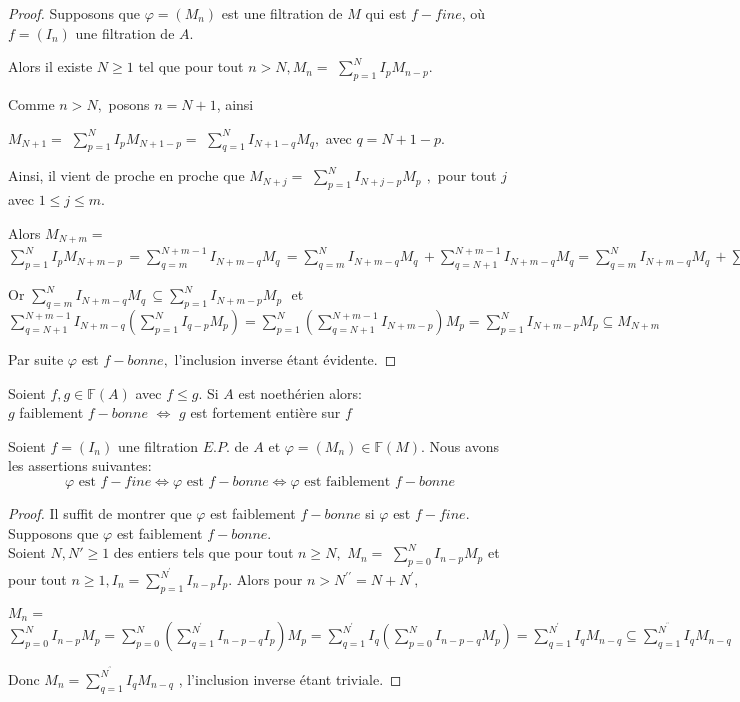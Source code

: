 \begin{proof}
	Supposons que $\varphi =(M_{n})$ est une filtration de $M$ qui est $f-fine$,
	où $f=(I_{n})$ une filtration de $A.$
	
	Alors il existe $N\geq 1$ tel que pour tout $n>N,M_{n}=$ $%
	\sum\limits_{p=1}^{N}I_{p}M_{n-p}.$
	
	Comme $n>N,$ posons $n=N+1$, ainsi
	
	$M_{N+1}=$ $\sum\limits_{p=1}^{N}I_{p}M_{N+1-p}=$ $\sum\limits_{q=1}^{N}I_{N+1-q}M_{q},$ avec $q=N+1-p.$
	
	Ainsi, il vient de proche en proche que $M_{N+j}=$  $\sum\limits_{p=1}^{N}I_{N+j-p}M_{p}\,\ ,$ pour tout $j$ avec $1\leq j\leq m.$
	
	Alors $M_{N+m}=$ $\sum\limits_{p=1}^{N}I_{p}M_{N+m-p}\,=\sum\limits_{q=m}^{N+m-1}I_{N+m-q}M_{q}\,=\sum\limits_{q=m}^{N}I_{N+m-q}M_{q}\,+\sum\limits_{q=N+1}^{N+m-1}I_{N+m-q}M_{q}=\sum\limits_{q=m}^{N}I_{N+m-q}M_{q}\,+\sum\limits_{q=N+1}^{N+m-1}I_{N+m-q}(\sum\limits_{p=1}^{N}I_{q-p}M_{p}).$
	
	Or $\sum\limits_{q=m}^{N}I_{N+m-q}M_{q}\,\subseteq
	\sum\limits_{p=1}^{N}I_{N+m-p}M_{p}\,$\ et $\sum\limits_{q=N+1}^{N+m-1}I_{N+m-q}(\sum\limits_{p=1}^{N}I_{q-p}M_{p})=\sum\limits_{p=1}^{N}(\sum\limits_{q=N+1}^{N+m-1}I_{N+m-p})M_{p}=\sum\limits_{p=1}^{N}I_{N+m-p}M_{p}\subseteq M_{N+m}$
	
	Par suite $\varphi $ est $f-bonne,$ l'inclusion inverse étant évidente.
\end{proof}
\begin{moncorollaire}
	Soient $f,g \in \mathbb{F}(A)$ avec $f \leqslant g$. Si $A$ est noethérien alors:\\ 
	$g$ faiblement $f-bonne$ $\Longleftrightarrow$ $g$ est fortement entière sur $f$
\end{moncorollaire}
\begin{maproposition}
	Soient $f=(I_n)$ une filtration $E.P.$ de $A$ et $\varphi=(M_n) \in \mathbb{F}(M)$. Nous avons les assertions suivantes:
	\[ \varphi \text{ est } f-fine \Longleftrightarrow \varphi \text{ est } f-bonne \Longleftrightarrow \varphi \text{ est faiblement } f-bonne   \]
\end{maproposition}
\begin{proof}
	Il suffit de montrer que $\varphi$ est faiblement $f-bonne$ si $\varphi$ est $f-fine$.\\ Supposons que $\varphi$ est faiblement $f-bonne$.\\
	Soient $N, N' \geqslant 1$ des entiers tels que pour tout $n \geqslant N,$
	$M_{n}=$ $\sum\limits_{p=0}^{N}I_{n-p}M_{p}$ et pour tout $n\geq
	1,I_{n}=\sum\limits_{p=1}^{N^{\prime }}I_{n-p}I_{p}.$ Alors pour $n>N^{\prime \prime }=N+N^{\prime},$
	
	$M_{n}=$ $\sum\limits_{p=0}^{N}I_{n-p}M_{p}=\sum\limits_{p=0}^{N}(%
	\sum\limits_{q=1}^{N^{\prime
	}}I_{n-p-q}I_{p})M_{p}=\sum\limits_{q=1}^{N^{\prime
	}}I_{q}(\sum\limits_{p=0}^{N}I_{n-p-q}M_{p})=\sum\limits_{q=1}^{N^{\prime
	}}I_{q}M_{n-q}\subseteq \sum\limits_{q=1}^{N^{^{\prime \prime }}}I_{q}M_{n-q}
	$
	
	Donc $M_{n}=\sum\limits_{q=1}^{N^{^{\prime \prime }}}I_{q}M_{n-q}$ ,
	l'inclusion inverse étant triviale. 
\end{proof}
